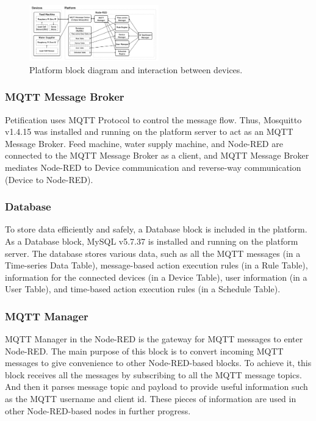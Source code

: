\documentclass[conference]{IEEEtran}
\begin{document}
\begin{figure}[htbp]
\centerline{\includegraphics[width=0.5\textwidth]{./images/Blocks.png}}
\caption{Platform block diagram and interaction between devices.}
\label{fig}
\end{figure}

\subsubsection{MQTT Message Broker}
\hfill \break Petification uses MQTT Protocol to control the message flow. Thus, Mosquitto v1.4.15 was installed and running on the platform server to act as an MQTT Message Broker. Feed machine, water supply machine, and Node-RED are connected to the MQTT Message Broker as a client, and MQTT Message Broker mediates Node-RED to Device communication and reverse-way communication (Device to Node-RED).

\subsubsection{Database}
\hfill \break To store data efficiently and safely, a Database block is included in the platform. As a Database block, MySQL v5.7.37 is installed and running on the platform server. The database stores various data, such as all the MQTT messages (in a Time-series Data Table), message-based action execution rules (in a Rule Table), information for the connected devices (in a Device Table), user information (in a User Table), and time-based action execution rules (in a Schedule Table).

\subsubsection{MQTT Manager}
\hfill \break MQTT Manager in the Node-RED is the gateway for MQTT messages to enter Node-RED. The main purpose of this block is to convert incoming MQTT messages to give convenience to other Node-RED-based blocks. To achieve it, this block receives all the messages by subscribing to all the MQTT message topics. And then it parses message topic and payload to provide useful information such as the MQTT username and client id. These pieces of information are used in other Node-RED-based nodes in further progress.
\end{document}
